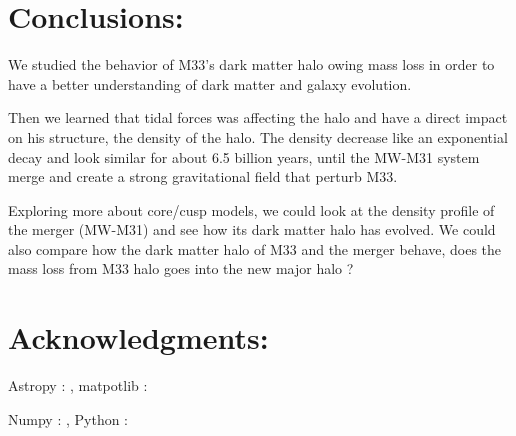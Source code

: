 \documentclass{aastex63}
\begin{document}
\newpage

\section{Conclusions:}

 We studied the behavior of M33's dark matter halo owing mass loss in order to have a better understanding of dark matter and galaxy evolution. 
 \vspace{0.5mm}
 
 Then we learned that tidal forces was affecting the halo and have a direct impact on his structure, the density of the halo. The density decrease like an exponential decay and look similar for about 6.5 billion years, until the MW-M31 system merge and create a strong gravitational field that perturb M33.
 \vspace{0.5mm}
 
 Exploring more about core/cusp models, we could look at the density profile of the merger (MW-M31) and see how its dark matter halo has evolved. We could also compare how the dark matter halo of M33 and the merger behave, does the mass loss from M33 halo goes into the new major halo ?

\section{Acknowledgments:}
Astropy : \cite{astropy:2018}
, matpotlib : \cite{Hunter:2007}

Numpy : \cite{Numpy}
, Python : \cite{python}

\cite{Bes}




{}



\end{document}
